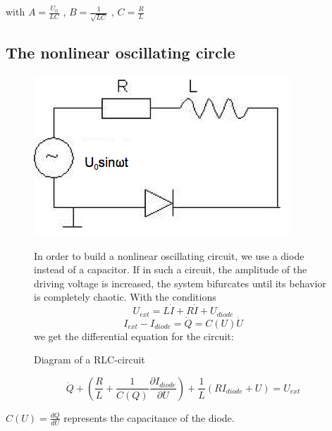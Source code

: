 with  $A=\frac{U_0}{LC}$ ,  $B=\frac{1}{\sqrt{LC}}$ ,  $C=\frac{R}{L}$

\subsection{The nonlinear oscillating circle}
\begin{figure}[H]
\begin{minipage}{0.5\textwidth}
\includegraphics[width=\textwidth]{Bilder/nlcirc.png}
\caption{Diagram of a RLC-circuit}
\end{minipage}
\begin{minipage}{0.5\textwidth}
In order to build a nonlinear oscillating circuit, we use a diode instead of a capacitor. If in such a circuit, the amplitude of the driving voltage is increased, the system bifurcates until its behavior is completely chaotic. With the conditions
$$U_{ext} = L\dot I + R\dot I + U_{diode}$$
$$I_{ext}-I_{diode} = \dot Q = C(U)\dot U$$
we get the differential equation for the circuit:
\end{minipage}
\end{figure}

\begin{equation} 
\ddot Q + \left(\frac{R}{L} + \frac{1}{C(Q)} \frac{\partial I_{diode}}{\partial U}\right) + \frac{1}{L}(RI_{diode}+U)=U_{ext} \end{equation}

$C(U) = \frac{dQ}{dU}$ represents the capacitance of the diode.

